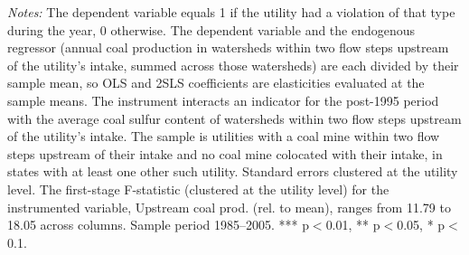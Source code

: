 \begin{table}[htbp]
\begin{minipage}{\linewidth}
\vspace{4pt}
\footnotesize
\raggedright
\textit{Notes:} The dependent variable equals 1 if the utility had a violation of that type during the year, 0 otherwise. The dependent variable and the endogenous regressor (annual coal production in watersheds within two flow steps upstream of the utility's intake, summed across those watersheds) are each divided by their sample mean, so OLS and 2SLS coefficients are elasticities evaluated at the sample means. The instrument interacts an indicator for the post-1995 period with the average coal sulfur content of watersheds within two flow steps upstream of the utility's intake. The sample is utilities with a coal mine within two flow steps upstream of their intake and no coal mine colocated with their intake, in states with at least one other such utility. Standard errors clustered at the utility level. The first-stage F-statistic (clustered at the utility level) for the instrumented variable, Upstream coal prod. (rel. to mean), ranges from 11.79 to 18.05 across columns. Sample period 1985--2005. *** p$<$0.01, ** p$<$0.05, * p$<$0.1.
\end{minipage}
\end{table}
